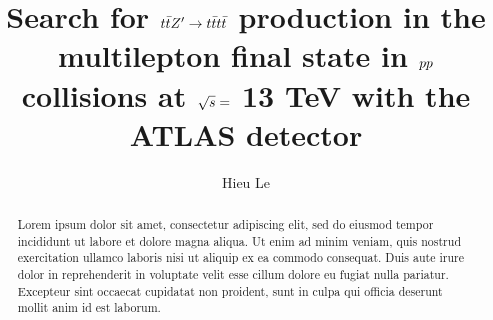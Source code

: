 \documentclass{msuphddissertation}
\author{Hieu Le} %
\title{Search for $\lowercase{\ttbar}Z' \rightarrow \lowercase{\tttt}$ production in the multilepton final state in $\lowercase{pp}$ collisions at \lowercase{$\sqrt{s}=$} 13 TeV with the ATLAS detector} %
\begin{document}
\maketitlepage %


\begin{abstract}
Lorem ipsum dolor sit amet, consectetur adipiscing elit, sed do eiusmod tempor incididunt ut labore et dolore magna aliqua. Ut enim ad minim veniam, quis nostrud exercitation ullamco laboris nisi ut aliquip ex ea commodo consequat. Duis aute irure dolor in reprehenderit in voluptate velit esse cillum dolore eu fugiat nulla pariatur. Excepteur sint occaecat cupidatat non proident, sunt in culpa qui officia deserunt mollit anim id est laborum.
\end{abstract}




\end{document}

